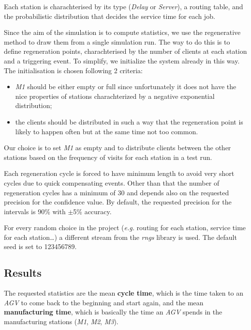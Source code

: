 \documentclass[paper=a4, fontsize=11pt]{scrartcl}
\numberwithin{equation}{section}		%
\numberwithin{figure}{section}			%
\numberwithin{table}{section}				%
\begin{document}
Each station is charachterised by its type (\textit{Delay} or \textit{Server}), a routing table, and the probabilistic distribution that decides the service time for each job.

Since the aim of the simulation is to compute statistics, we use the regenerative method to draw them from a single simulation run. The way to do this is to define regeneration points, charachterised by the number of clients at each station and a triggering event. To simplify, we initialize the system already in this way.
The initialisation is chosen following 2 criteria:
\begin{itemize}
	\item \textit{M1} should be either empty or full since unfortunately it does not have the nice properties of stations charachterized by a negative exponential distribution;
	\item the clients should be distributed in such a way that the regeneration point is likely to happen often but at the same time not too common.
\end{itemize}
Our choice is to set \textit{M1} as empty and to distribute clients between the other stations based on the frequency of visits for each station in a test run.

Each regeneration cycle is forced to have minimum length to avoid very short cycles due to quick compensating events. Other than that the number of regeneration cycles has a minimum of 30 and depends also on the requested precision for the confidence value. By default, the requested precision for the intervals is 90\% with $\pm$5\% accuracy.

For every random choice in the project (\textit{e.g.} routing for each station, service time for each station\dots) a different stream from the \textit{rngs} library is used. The default seed is set to 123456789.

\subsection{Results}
The requested statistics are the mean \textbf{cycle time}, which is the time taken to an \textit{AGV} to come back to the beginning and start again, and the mean \textbf{manufacturing time}, which is basically the time an \textit{AGV} spends in the manufacturing stations (\textit{M1}, \textit{M2}, \textit{M3}).

\end{document}
